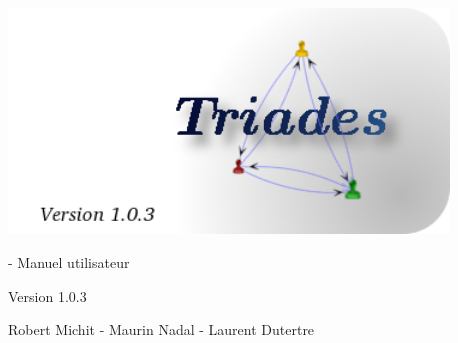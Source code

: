 \begin{titlepage}
~\\
\vspace{50pt}

\begin{center}
\includegraphics[height = 6cm]{images/splashScreen.png} 


\vspace{230pt}
\begin{Huge}
\tria - Manuel utilisateur\\
\end{Huge}
\begin{Large}
\vspace{20pt}
Version 1.0.3\\

\end{Large}
Robert Michit - Maurin Nadal - Laurent Dutertre
\end{center}

\end{titlepage}

